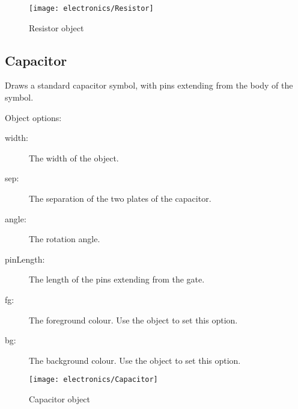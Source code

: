 \begin{figure}[h]
\centerline{\texttt{[image: electronics/Resistor]}}
\caption{Resistor object}
\label{fig:resistor}
\end{figure}

\subsection{Capacitor}
Draws a standard capacitor symbol, with pins extending from the body of the
symbol.

Object options:
\begin{description}
\item[width:] The width of the object.
\item[sep:] The separation of the two plates of the capacitor.
\item[angle:] The rotation angle.
\item[pinLength:] The length of the pins extending from the gate.
\item[fg:] The foreground colour.  Use the  object to set this
option.
\item[bg:] The background colour.  Use the  object to set this
option.
\end{description}

\begin{figure}[h]
\centerline{\texttt{[image: electronics/Capacitor]}}
\caption{Capacitor object}
\label{fig:capacitor}
\end{figure}

